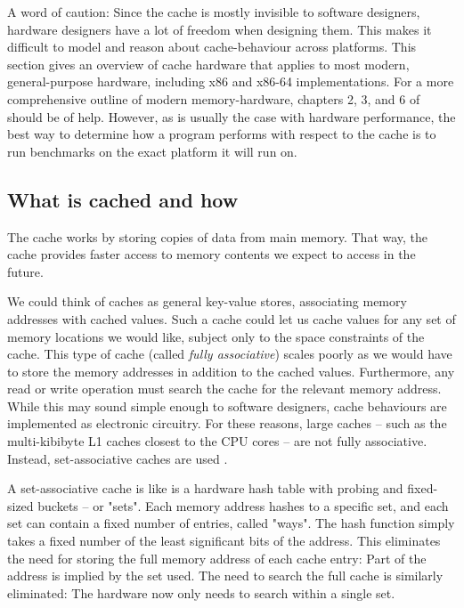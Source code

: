 A word of caution:
Since the cache is mostly invisible to software designers, hardware designers
have a lot of freedom when designing them. This makes it difficult to model and
reason about cache-behaviour across platforms. This section gives an overview
of cache hardware that applies to most modern, general-purpose hardware,
including x86 and x86-64 implementations. For a more comprehensive outline of
modern memory-hardware, chapters 2, 3, and 6 of
\cite{whatprogrammersshouldknow} should be of help. However, as is usually the
case with hardware performance, the best way to determine how a program
performs with respect to the cache is to run benchmarks on the exact platform
it will run on.

\subsection{What is cached and how} The cache works by storing copies
of data from main memory. That way, the cache provides faster access to
memory contents we expect to access in the future.

We could think of caches as general key-value stores, associating memory
addresses with cached values. Such a cache could let us cache values for any
set of memory locations we would like, subject only to the space constraints of
the cache. This type of cache (called \textit{fully associative}) scales
poorly as we would have to store the memory addresses in addition to the cached
values. Furthermore, any read or write operation must search the cache for the
relevant memory address. While this may sound simple enough to software
designers, cache behaviours are implemented as electronic circuitry. For these
reasons, large caches -- such as the multi-kibibyte L1 caches closest to the CPU
cores -- are not fully associative. Instead, set-associative caches are used
\cite{whatprogrammersshouldknow} \cite{mckenny-barriers}.

A set-associative cache is like is a hardware hash table with probing and
fixed-sized buckets -- or "sets". Each memory address hashes to a specific set,
and each set can contain a fixed number of entries, called "ways". The hash
function simply takes a fixed number of the least significant bits of the
address. This eliminates the need for storing the full memory address of each
cache entry: Part of the address is implied by the set used. The need to search
the full cache is similarly eliminated: The hardware now only needs to search
within a single set.

